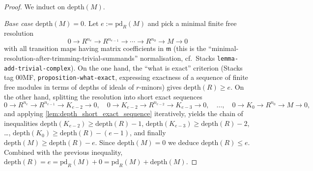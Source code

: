 \begin{proof}



\leanok
  We induct on \(\text{depth}(M)\).

  \emph{Base case \(\text{depth}(M) = 0\).} Let \(e := \text{pd}_R(M)\) and pick a minimal
  finite free resolution
  \[
    0 \longrightarrow R^{n_e} \longrightarrow R^{n_{e-1}} \longrightarrow
    \cdots \longrightarrow R^{n_0} \longrightarrow M \longrightarrow 0
  \]
  with all transition maps having matrix coefficients in \(\mathfrak{m}\) (this is the
  ``minimal-resolution-after-trimming-trivial-summands'' normalisation, cf.\ Stacks
  \texttt{lemma-add-trivial-complex}). On the one hand, the ``what is exact'' criterion
  (Stacks tag 00MF, \texttt{proposition-what-exact}, expressing exactness of a sequence of
  finite free modules in terms of depths of ideals of \(r\)-minors) gives
  \(\text{depth}(R) \geq e\). On the other hand, splitting the resolution into short exact
  sequences
  \[
    0 \to R^{n_e} \to R^{n_{e-1}} \to K_{e-2} \to 0, \quad
    0 \to K_{e-2} \to R^{n_{e-2}} \to K_{e-3} \to 0, \quad \dots, \quad
    0 \to K_0 \to R^{n_0} \to M \to 0,
  \]
  and applying \cref{lem:depth_short_exact_sequence} iteratively,
  yields the chain of inequalities
  \(\text{depth}(K_{e-2}) \geq \text{depth}(R) - 1\),
  \(\text{depth}(K_{e-3}) \geq \text{depth}(R) - 2\), \dots,
  \(\text{depth}(K_0) \geq \text{depth}(R) - (e-1)\), and finally
  \(\text{depth}(M) \geq \text{depth}(R) - e\). Since \(\text{depth}(M) = 0\) we deduce
  \(\text{depth}(R) \leq e\). Combined with the previous inequality, $\text{depth}(R) = e =
  \text{pd}_R(M) + 0 = \text{pd}_R(M) + \text{depth}(M)$.


\end{proof}
